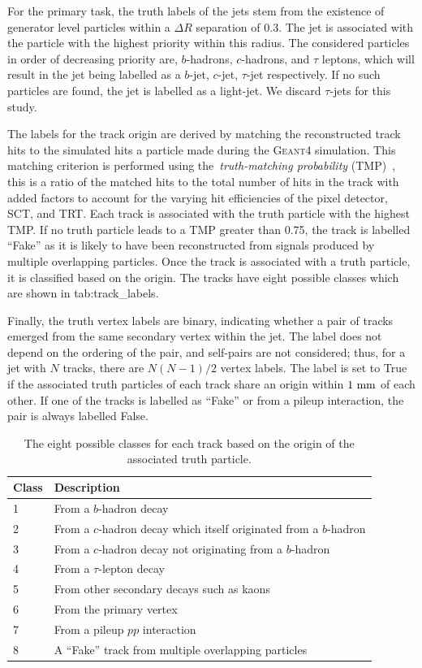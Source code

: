 For the primary task, the truth labels of the jets stem from the existence of generator level particles within a $\Delta R$ separation of 0.3.
The jet is associated with the particle with the highest priority within this radius.
The considered particles in order of decreasing priority are, $b$-hadrons, $c$-hadrons, and $\tau$ leptons, which will result in the jet being labelled as a $b$-jet, $c$-jet, $\tau$-jet respectively.
If no such particles are found, the jet is labelled as a light-jet.
We discard $\tau$-jets for this study.

The labels for the track origin are derived by matching the reconstructed track hits to the simulated hits a particle made during the \textsc{Geant4} simulation.
This matching criterion is performed using the~\textit{truth-matching probability} (TMP)~\cite{PerformanceATLASTrack}, this is a ratio of the matched hits to the total number of hits in the track with added factors to account for the varying hit efficiencies of the pixel detector, SCT, and TRT\@.
Each track is associated with the truth particle with the highest TMP\@.
If no truth particle leads to a TMP greater than 0.75, the track is labelled ``Fake'' as it is likely to have been reconstructed from signals produced by multiple overlapping particles.
Once the track is associated with a truth particle, it is classified based on the origin.
The tracks have eight possible classes which are shown in \Cref
{tab:track_labels}.

Finally, the truth vertex labels are binary, indicating whether a pair of tracks emerged from the same secondary vertex within the jet.
The label does not depend on the ordering of the pair, and self-pairs are not considered; thus, for a jet with $N$ tracks, there are $N(N-1)/2$ vertex labels.
The label is set to True if the associated truth particles of each track share an origin within $1~\mm$ of each other.
If one of the tracks is labelled as ``Fake'' or from a pileup interaction, the pair is always labelled False.

\begin{table}
    \centering
    \begin{tabular}{ll}
        \toprule
        Class & Description \\
        \midrule
        1 & From a $b$-hadron decay \\
        2 & From a $c$-hadron decay which itself originated from a $b$-hadron \\
        3 & From a $c$-hadron decay not originating from a $b$-hadron \\
        4 & From a $\tau$-lepton decay \\
        5 & From other secondary decays such as kaons \\
        6 & From the primary vertex \\
        7 & From a pileup $pp$ interaction \\
        8 & A ``Fake'' track from multiple overlapping particles \\
        \bottomrule
    \end{tabular}
    \caption{The eight possible classes for each track based on the origin of the associated truth particle.}
    \label{tab:track_labels}
\end{table}

